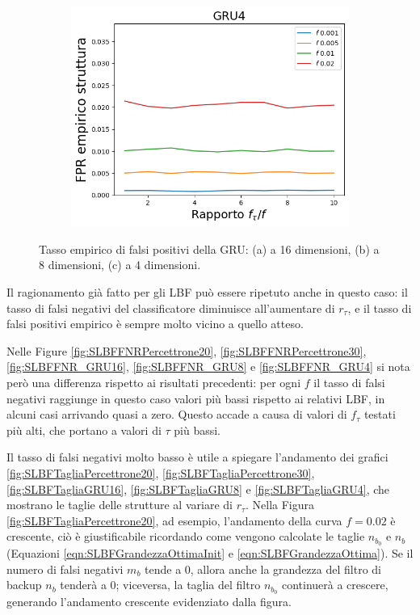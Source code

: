 \documentclass[../../main.tex]{subfiles}
\begin{document}
\begin{figure}[H]
        \begin{subfigure}[b]{0.49\textwidth}
            \centering
            \includegraphics[width = \textwidth]{immagini/7/SLBF/GRU4_FPR.png}
            \caption{}
            \label{fig:SLBFFPR_GRU4}
        \end{subfigure}
        \caption{Tasso empirico di falsi positivi della GRU: (a) a 16 dimensioni, (b) a 8 dimensioni, (c) a 4 dimensioni.}
        \label{fig:SLBFFPR_GRU}
    \end{figure}

    Il ragionamento già fatto per gli LBF può essere ripetuto anche in questo caso: il tasso di falsi negativi del classificatore diminuisce all'aumentare di $r_{\tau}$, e il tasso di falsi positivi empirico è sempre molto vicino a quello atteso.

    Nelle Figure \ref{fig:SLBFFNRPercettrone20}, \ref{fig:SLBFFNRPercettrone30}, \ref{fig:SLBFFNR_GRU16}, \ref{fig:SLBFFNR_GRU8} e \ref{fig:SLBFFNR_GRU4} si nota però una differenza rispetto ai risultati precedenti: per ogni $f$ il tasso di falsi negativi raggiunge in questo caso valori più bassi rispetto ai relativi LBF, in alcuni casi arrivando quasi a zero. Questo accade a causa di valori di $f_\tau$ testati più alti, che portano a valori di $\tau$ più bassi.

    Il tasso di falsi negativi molto basso è utile a spiegare l'andamento dei grafici \ref{fig:SLBFTagliaPercettrone20}, \ref{fig:SLBFTagliaPercettrone30}, \ref{fig:SLBFTagliaGRU16}, \ref{fig:SLBFTagliaGRU8} e \ref{fig:SLBFTagliaGRU4}, che mostrano le taglie delle strutture al variare di $r_\tau$. Nella Figura \ref{fig:SLBFTagliaPercettrone20}, ad esempio, l'andamento della curva $f = 0.02$ è crescente, ciò è giustificabile ricordando come vengono calcolate le taglie $n_{b_0}$ e $n_b$ (Equazioni \eqref{eqn:SLBFGrandezzaOttimaInit} e \eqref{eqn:SLBFGrandezzaOttima}). Se il numero di falsi negativi $m_b$ tende a 0, allora anche la grandezza del filtro di backup $n_b$ tenderà a 0; viceversa, la taglia del filtro $n_{b_0}$ continuerà a crescere, generando l'andamento crescente evidenziato dalla figura.
\end{document}
